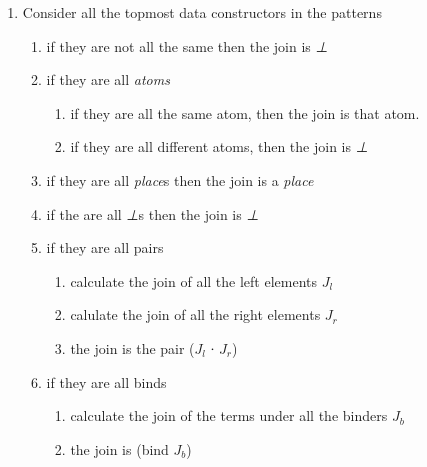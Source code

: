 \begin{appendices}
\begin{enumerate}
\item Consider all the topmost data constructors in the patterns
  \begin{enumerate}
  \item if they are not all the same then the join is \emph{⊥}
  \item if they are all \emph{atoms}
    \begin{enumerate}
    \item if they are all the same atom, then the join is that atom.
      \item if they are all different atoms, then the join is \emph{⊥}
    \end{enumerate}
  \item if they are all \emph{place}s then the join is a \emph{place}
  \item if the are all \emph{⊥}s then the join is \emph{⊥}  
  \item if they are all pairs
    \begin{enumerate}
      \item calculate the join of all the left elements $J_l$
      \item calulate the join of all the right elements $J_r$
      \item the join is the pair ($J_l$ ∙ $J_r$)
    \end{enumerate}
  \item if they are all binds
    \begin{enumerate}
    \item calculate the join of the terms under all the binders $J_b$
    \item the join is (bind $J_b$)
    \end{enumerate}
  \end{enumerate}
\end{enumerate}

\end{appendices}
